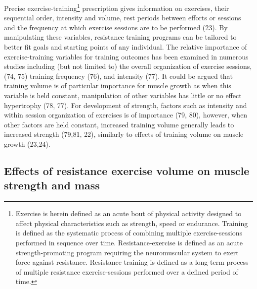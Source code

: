 \documentclass[twoside,10pt]{gihclass} %
\begin{document}
Precise exercise-training\footnote{Exercise is herein defined as an acute bout of physical activity designed to affect physical characteristics such as strength, speed or endurance. Training is defined as the systematic process of combining multiple exercise-sessions performed in sequence over time. Resistance-exercise is defined as an acute strength-promoting program requiring the neuromuscular system to exert force against resistance. Resistance training is defined as a long-term process of multiple resistance exercise-sessions performed over a defined period of time.}
prescription gives information on exercises, their sequential order, intensity and volume, rest periods between efforts or sessions and the frequency at which exercise sessions are to be performed
(23).
By manipulating these variables, resistance training programs can be tailored to better fit goals and starting points of any individual.
The relative importance of exercise-training variables for training outcomes has been examined in numerous studies including (but not limited to) the overall organization of exercise sessions,
(74, 75)
training frequency
(76),
and intensity
(77).
It could be argued that training volume is of particular importance for muscle growth as when this variable is held constant, manipulation of other variables has little or no effect hypertrophy
(78, 77).
For development of strength, factors such as intensity and within session organization of exercises is of importance
(79, 80),
however, when other factors are held constant, increased training volume generally leads to increased strength
(79,81, 22),
similarly to effects of training volume on muscle growth
(23,24).

\hypertarget{effects-of-resistance-exercise-volume-on-muscle-strength-and-mass}{%
\subsection{Effects of resistance exercise volume on muscle strength and mass}\label{effects-of-resistance-exercise-volume-on-muscle-strength-and-mass}}
\end{document}
